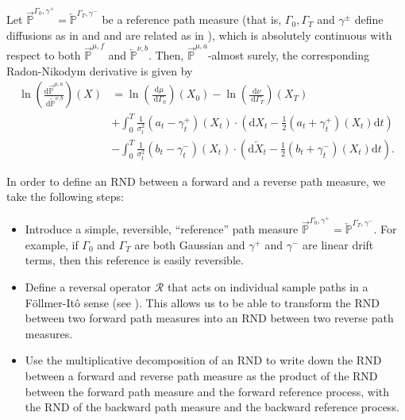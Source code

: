 \begin{selfproposition}
    \label{prop:fbrnd}
    Let $\overrightarrow{\mathbb{P}}^{\Gamma_0, \gamma^{+}} = \overleftarrow{\mathbb{P}}^{\Gamma_T, \gamma^{-}}$ be a reference path measure (that is, $\Gamma_0, \Gamma_T$ and $\gamma^{ \pm}$ define diffusions as in  and  and are related as in ), which is absolutely continuous with respect to both $\overrightarrow{\mathbb{P}}^{\mu, f}$ and $\overleftarrow{\mathbb{P}}^{\nu, b}$. Then, $\overrightarrow{\mathbb{P}}^{\mu, a}$-almost surely, the corresponding Radon-Nikodym derivative is given by\label{ntn:fbrnd}\label{ntn:fwd_reference}\label{ntn:bwd_reference}
    \begin{subequations}
        \label{eq:fbrnd}
    \begin{align}
        \ln \left(\frac{\mathrm{d} \overrightarrow{\mathbb{P}}^{\mu, a}}{\mathrm{~d} \overleftarrow{\mathbb{P}}^{\nu, b}}\right)(X) & =\ln \left(\frac{\mathrm{d} \mu}{\mathrm{~d} \Gamma_0}\right)\left(X_0\right)-\ln \left(\frac{\mathrm{d} \nu}{\mathrm{~d} \Gamma_T}\right)\left(X_T\right) \label{eq:fbrnd_boundary} \\
        & +\int_0^T \frac{1}{\sigma_t^2}\left(a_t-\gamma_t^{+}\right)\left(X_t\right) \cdot\left(\mathrm{d} X_t-\frac{1}{2}\left(a_t+\gamma_t^{+}\right)\left(X_t\right) \mathrm{d} t\right) \label{eq:fbrnd_fwd} \\
        & -\int_0^T \frac{1}{\sigma_t^2}\left(b_t-\gamma_t^{-}\right)\left(X_t\right) \cdot\left(\mathrm{d} \overleftarrow{X}_t-\frac{1}{2}\left(b_t+\gamma_t^{-}\right)\left(X_t\right) \mathrm{d} t\right) \label{eq:fbrnd_bwd}.
    \end{align}
\end{subequations}
\end{selfproposition}
\begin{proofsketch}
    In order to define an RND between a forward and a reverse path measure, we take the following steps:
    \begin{itemize}
        \item Introduce a simple, reversible, ``reference'' path measure $\overrightarrow{\mathbb{P}}^{\Gamma_0, \gamma^{+}} = \overleftarrow{\mathbb{P}}^{\Gamma_T, \gamma^{-}}$. For example, if $\Gamma_0$ and $\Gamma_T$ are both Gaussian and $\gamma^{+}$ and $\gamma^{-}$ are linear drift terms, then this reference is easily reversible. 
        \item Define a reversal operator $\mathcal{R}$ that acts on individual sample paths in a F{\"o}llmer-Itô sense (see ). This allows us to be able to transform the RND between two forward path measures into an RND between two reverse path measures. 
        \item Use the multiplicative decomposition of an RND to write down the RND between a forward and reverse path measure as the product of the RND between the forward path measure and the forward reference process, with the RND of the backward path measure and the backward reference process.
    \end{itemize}
\end{proofsketch}
